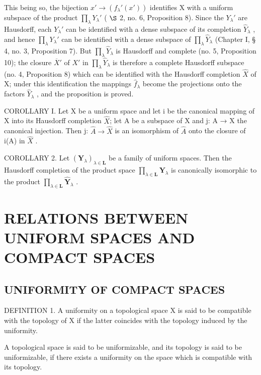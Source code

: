 This being so, the bijection \(x' \to (f_{\lambda}'(x'))\) identifies X with a uniform subspace of the product \(\prod_{\lambda} Y_{\lambda}'\) ( \(\S\) 2, no. 6, Proposition 8). Since the \(Y_{\lambda}'\) are Hausdorff, each \(Y_{\lambda}'\) can be identified with a dense subspace of its completion \(\hat{Y}_{\lambda}\) , and hence \(\prod_{\lambda} Y_{\lambda}'\) can be identified with a dense subspace of \(\prod_{\lambda} \hat{Y}_{\lambda}\) (Chapter I, § 4, no. 3, Proposition 7). But \(\prod_{\lambda} \hat{Y}_{\lambda}\) is Hausdorff and complete (no. 5, Proposition 10); the closure \(\overline{X}'\) of \(X'\) in \(\prod_{\lambda} \hat{Y}_{\lambda}\) is therefore a complete Hausdorff subspace (no. 4, Proposition 8) which can be identified with the Hausdorff completion \(\hat{X}\) of X; under this identification the mappings \(\hat{f}_{\lambda}\) become the projections onto the factors \(\hat{Y}_{\lambda}\) , and the proposition is proved.

COROLLARY I. Let X be a uniform space and let i be the canonical mapping of X into its Hausdorff completion \(\hat{X}\); let A be a subspace of X and j: A → X the canonical injection. Then j: \(\hat{A} \rightarrow \hat{X}\) is an isomorphism of \(\hat{A}\) onto the closure of i(A) in \(\hat{X}\) .

COROLLARY 2. Let \((\mathbf{Y}_{\lambda})_{\lambda \in \mathbf{L}}\) be a family of uniform spaces. Then the Hausdorff completion of the product space \(\prod_{\lambda \in \mathbf{L}}\mathbf{Y}_{\lambda}\) is canonically isomorphic to the product \(\prod_{\lambda \in \mathbf{L}}\hat{\mathbf{Y}}_{\lambda}\) .

\section{RELATIONS BETWEEN UNIFORM SPACES AND COMPACT SPACES}

\subsection{UNIFORMITY OF COMPACT SPACES}

DEFINITION 1. A uniformity on a topological space X is said to be compatible with the topology of X if the latter coincides with the topology induced by the uniformity.

A topological space is said to be uniformizable, and its topology is said to be uniformizable, if there exists a uniformity on the space which is compatible with its topology.

